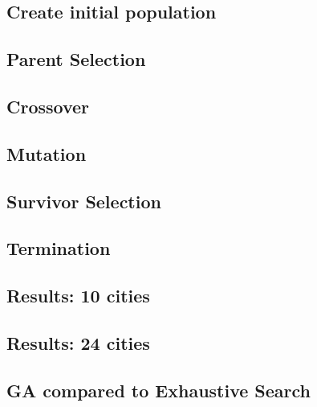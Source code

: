 \documentclass{article}
\begin{document}
    \subsection{Create initial population}

    \subsection{Parent Selection}

    \subsection{Crossover}

    \subsection{Mutation}

    \subsection{Survivor Selection}

    \subsection{Termination}

    \subsection{Results: 10 cities}

    \subsection{Results: 24 cities}

    \subsection{GA compared to Exhaustive Search}
\end{document}
